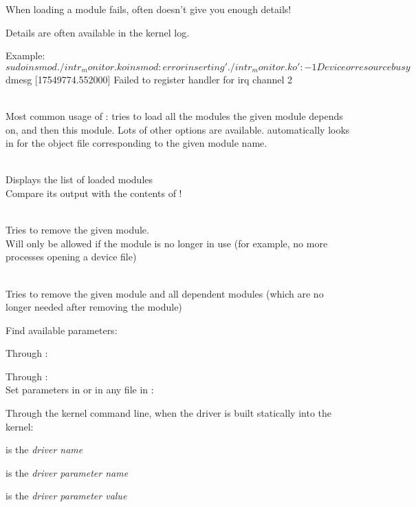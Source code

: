   \startitemize
  \item When loading a module fails,  often doesn't give
    you enough details!
  \item Details are often available in the kernel log.
  \item Example:\\
\starttyping
$ sudo insmod ./intr_monitor.ko
insmod: error inserting './intr_monitor.ko': -1 Device or resource busy
$ dmesg
[17549774.552000] Failed to register handler for irq channel 2
\stoptyping
  \stopitemize

  \startitemize
  \item {}\\
    Most common usage of : tries to load all the
    modules the given module depends on, and then this module. Lots of
    other options are available.  automatically looks in
     for the object file corresponding
    to the given module name.
  \item {}\\
    Displays the list of loaded modules\\
    Compare its output with the contents of !
  \stopitemize

  \startitemize
  \item {}\\
    Tries to remove the given module.\\
    Will only be allowed if the module is no longer in use (for
    example, no more processes opening a device file)
  \item {}\\
    Tries to remove the given module and all dependent modules (which
    are no longer needed after removing the module)
  \stopitemize

  \startitemize
  \item Find available parameters:\\
  \item Through :\\
  \item Through :\\
    Set parameters in  or in any file in :\\
  \item Through the kernel command line, when the driver is built statically into the kernel:\\
    \startitemize
    \item {} is the {\em driver name}
    \item {} is the {\em driver parameter name}
    \item {} is the {\em driver parameter value}
    \stopitemize
  \stopitemize

